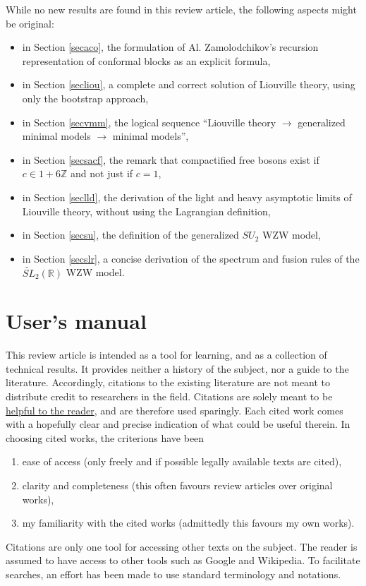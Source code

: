 \documentclass[12pt,a4paper,notitlepage]{report}
\newcommand \Z {\mathbb{Z}}
\numberwithin{equation}{section}
\theoremstyle{break}
\begin{document}
While no new results are found in this review article, the following aspects might be original:
\begin{itemize}
\item in Section \ref{secaco}, the formulation of Al. Zamolodchikov's recursion representation of conformal blocks as an explicit formula,
\item in Section \ref{secliou}, a complete and correct solution of Liouville theory, using only the bootstrap approach, 
\item in Section \ref{secvmm}, the logical sequence ``Liouville theory $\rightarrow$ generalized minimal models $\rightarrow$ minimal models'',
\item in Section \ref{secsacf}, the remark that compactified free bosons exist if $c\in 1+6\Z$ and not just if $c=1$,
\item in Section \ref{seclld}, the derivation of the light and heavy asymptotic limits of Liouville theory, without using the Lagrangian definition,
\item in Section \ref{secsu}, the definition of the generalized $SU_2$ WZW model,
\item in Section \ref{secslr}, a concise derivation of the spectrum and fusion rules of the $\widetilde{SL}_2(\mathbb{R})$ WZW model.
\end{itemize}


\section{User's manual}

This review article is intended as a tool for learning, and as a collection of technical results. It provides neither a history of the subject, nor a guide to the literature. Accordingly, citations to the existing literature are not meant to distribute credit to researchers in the field. Citations are solely meant to be 
\href{http://researchpracticesandtools.blogspot.fr/2013/08/write-for-humans-not-for-robots.html}
{helpful to the reader}, and are therefore used sparingly. Each cited work comes with a hopefully clear and precise indication of what could be useful therein. In choosing cited works, the criterions have been
\begin{enumerate}
\item ease of access (only freely and if possible legally available texts are cited), 
\item clarity and completeness (this often favours review articles over original works),
\item my familiarity with the cited works (admittedly this favours my own works). 
\end{enumerate}
Citations are only one tool for accessing other texts on the subject. 
The reader is assumed to have access to other tools such as Google and Wikipedia. 
To facilitate searches, an effort has been made to use standard terminology and notations. 
\end{document}
